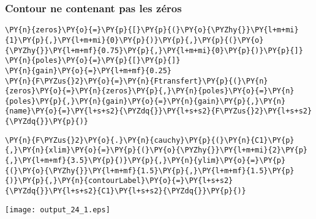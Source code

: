 \subsubsection{Contour ne contenant pas les zéros\label{contour-nentourant-pas-les-zuxe9ros}}
\begin{tcolorbox}[breakable, size=fbox, boxrule=1pt, pad at break*=1mm,colback=cellbackground, colframe=cellborder]
\begin{Verbatim}[commandchars=\\\{\}]
\PY{n}{zeros}\PY{o}{=}\PY{p}{[}\PY{p}{(}\PY{o}{\PYZhy{}}\PY{l+m+mi}{1}\PY{p}{,}\PY{l+m+mi}{0}\PY{p}{)}\PY{p}{,}\PY{p}{(}\PY{o}{\PYZhy{}}\PY{l+m+mf}{0.75}\PY{p}{,}\PY{l+m+mi}{0}\PY{p}{)}\PY{p}{]}
\PY{n}{poles}\PY{o}{=}\PY{p}{[}\PY{p}{]}
\PY{n}{gain}\PY{o}{=}\PY{l+m+mf}{0.25}
\PY{n}{F\PYZus{}2}\PY{o}{=}\PY{n}{Ftransfert}\PY{p}{(}\PY{n}{zeros}\PY{o}{=}\PY{n}{zeros}\PY{p}{,}\PY{n}{poles}\PY{o}{=}\PY{n}{poles}\PY{p}{,}\PY{n}{gain}\PY{o}{=}\PY{n}{gain}\PY{p}{,}\PY{n}{name}\PY{o}{=}\PY{l+s+s2}{\PYZdq{}}\PY{l+s+s2}{F\PYZus{}2}\PY{l+s+s2}{\PYZdq{}}\PY{p}{)}
\end{Verbatim}
\end{tcolorbox}
\begin{tcolorbox}[breakable, size=fbox, boxrule=1pt, pad at break*=1mm,colback=cellbackground, colframe=cellborder]
\begin{Verbatim}[commandchars=\\\{\}]
\PY{n}{F\PYZus{}2}\PY{o}{.}\PY{n}{cauchy}\PY{p}{(}\PY{n}{C1}\PY{p}{,}\PY{n}{xlim}\PY{o}{=}\PY{p}{(}\PY{o}{\PYZhy{}}\PY{l+m+mi}{2}\PY{p}{,}\PY{l+m+mf}{3.5}\PY{p}{)}\PY{p}{,}\PY{n}{ylim}\PY{o}{=}\PY{p}{(}\PY{o}{\PYZhy{}}\PY{l+m+mf}{1.5}\PY{p}{,}\PY{l+m+mf}{1.5}\PY{p}{)}\PY{p}{,}\PY{n}{contourLabel}\PY{o}{=}\PY{l+s+s2}{\PYZdq{}}\PY{l+s+s2}{C1}\PY{l+s+s2}{\PYZdq{}}\PY{p}{)}
\end{Verbatim}
\end{tcolorbox}
\begin{center}
    \texttt{[image: output\_24\_1.eps]}
\end{center}
